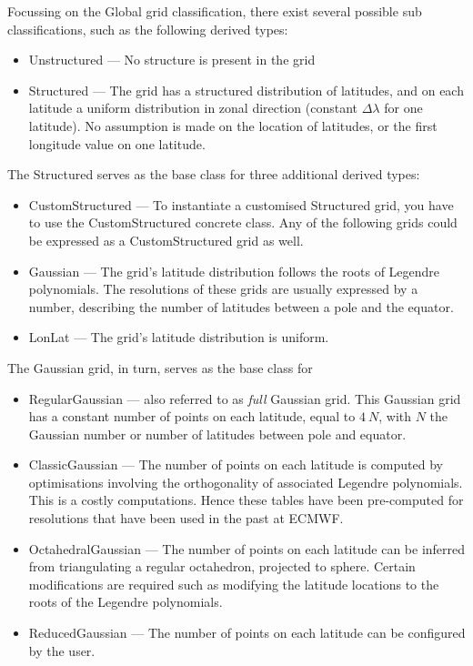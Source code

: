 %
Focussing on the Global grid classification, there exist several
possible sub classifications, such as the following derived types: 
\begin{itemize}
  \setlength\itemsep{0.4em}
  \item Unstructured --- No structure is present in the grid
  \item Structured --- The grid has a structured distribution of latitudes, and on each latitude a uniform distribution in zonal direction (constant $\Delta\lambda$ for one latitude). No assumption is made on the location of latitudes, or the first longitude value on one latitude.
\end{itemize}
The Structured serves as the base class for three additional derived types:
\begin{itemize}
  \setlength\itemsep{0.4em}
  \item CustomStructured --- To instantiate a customised Structured grid,
        you have to use the CustomStructured concrete class. Any of the
        following grids could be expressed as a CustomStructured grid as well.
  \item Gaussian --- The grid's latitude distribution follows the
        roots of Legendre polynomials. The resolutions of these grids are
        usually expressed by a number, describing the number of latitudes
        between a pole and the equator.
  \item LonLat --- The grid's latitude distribution is uniform.
\end{itemize}
The Gaussian grid, in turn, serves as the base class for 
\begin{itemize}
  \item RegularGaussian --- also referred to as \emph{full} Gaussian grid.
        This Gaussian grid has a constant number of points on each latitude, 
        equal to $4\ N$, with $N$ the Gaussian number or number of latitudes
        between pole and equator.
  \item ClassicGaussian --- The number of points on each latitude is computed
        by optimisations involving the orthogonality of associated Legendre
        polynomials. This is a costly computations. Hence these tables have been
        pre-computed for resolutions that have been used in the past at ECMWF.
  \item OctahedralGaussian --- The number of points on each latitude
        can be inferred from triangulating a regular octahedron, projected to
        sphere. Certain modifications are required such as modifying the
        latitude locations to the roots of the Legendre polynomials.
  \item ReducedGaussian --- The number of points on each latitude can be 
        configured by the user.
\end{itemize}
